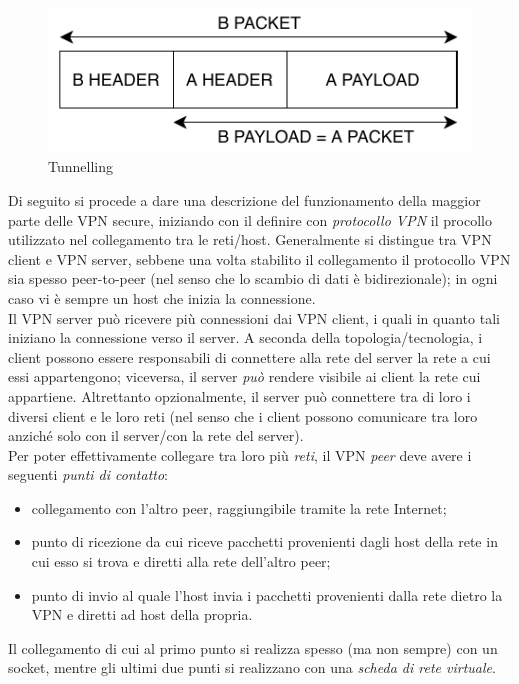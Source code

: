 \begin{figure}
	\includegraphics[scale=0.7]{img/tunnelling}
	\caption{Tunnelling}
	\label{fig:tunnelling}
\end{figure}


Di seguito si procede a dare una descrizione del funzionamento della maggior parte
delle VPN secure, iniziando con il definire con \textit{protocollo VPN}
il procollo utilizzato nel collegamento tra le reti/host.
Generalmente si distingue tra VPN client e VPN server, sebbene
una volta stabilito il collegamento il protocollo VPN sia spesso peer-to-peer
(nel senso che lo scambio di dati è bidirezionale);
in ogni caso vi è sempre un host che inizia la connessione.\\
Il VPN server può ricevere più connessioni dai VPN client, i quali in quanto tali
iniziano la connessione verso il server. A seconda della topologia/tecnologia,
i client possono essere responsabili di connettere alla rete del server la rete
a cui essi appartengono; viceversa, il server \textit{può} rendere visibile ai client
la rete cui appartiene. Altrettanto opzionalmente,
il server può connettere tra di loro i diversi client e le loro reti (nel senso che
i client possono comunicare tra loro anziché solo con il server/con la rete del server).\\
Per poter effettivamente collegare tra loro più \textit{reti}, il VPN \textit{peer}
deve avere i seguenti \textit{punti di contatto}:
\begin{itemize}
	\item collegamento con l'altro peer, raggiungibile tramite la rete Internet;
	\item punto di ricezione da cui riceve pacchetti provenienti dagli host della
	      rete in cui esso si trova e diretti alla rete dell'altro peer;
	\item punto di invio al quale l'host invia i pacchetti provenienti dalla rete dietro
	      la VPN
	      e diretti ad host della propria.
\end{itemize}
Il collegamento di cui al primo punto si realizza spesso (ma non sempre) con un socket,
mentre gli ultimi due punti si realizzano con una \textit{scheda di rete virtuale}.\\
